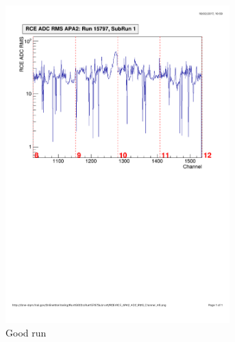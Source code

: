 \begin{figure}
  \centering
  \begin{subfigure}{0.45\linewidth}
    \centering
    \includegraphics[width=0.95\textwidth]{DataRMSGood.pdf}
    \caption{Good run}
    \label{fig:DataRMSGoodRun}
  \end{subfigure}
  \hfill
  \begin{subfigure}{0.45\linewidth}
    \centering

\end{subfigure}
\end{figure}
